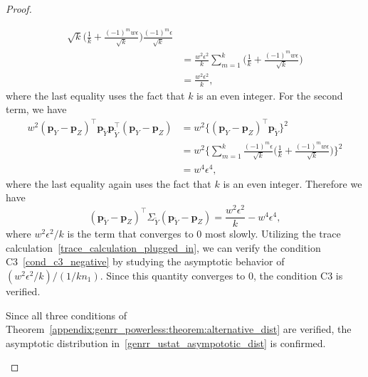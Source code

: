 \documentclass[twoside,11pt]{article}
\newcommand{\rvTwo}{Y}
\newcommand{\rvThree}{Z}
\newcommand{\alphabetSize}{k} %
\newcommand{\vectorIndex}{m}
\newcommand{\sampleSize}{n}
\newcommand{\probVec}{\mathbf{p}} %
\begin{document}
\begin{appendix}
\begin{proof}
\begin{itemize}
\begin{itemize}
\begin{align*}
{				}{
					\sqrt{\alphabetSize}
				}
				\biggl(
				\frac{1}{\alphabetSize}
				+
				\frac{
					(-1)^\vectorIndex 
					w\epsilon
				}{
					\sqrt{\alphabetSize}
				}
				\biggr)
				\frac{
					(-1)^\vectorIndex \epsilon
				}{
					\sqrt{\alphabetSize}
				}
				\\&=%
				\frac{w^2\epsilon^2}{
					\alphabetSize
				}
				\sum_{\vectorIndex=1}^\alphabetSize
				\biggl(
				\frac{1}{\alphabetSize}
				+
				\frac{
					(-1)^\vectorIndex w\epsilon
				}{
					\sqrt{\alphabetSize}
				}
				\biggr)
				\\&=%
				\frac{w^2\epsilon^2}{
					\alphabetSize
				},
			\end{align*}
			where the last equality uses the fact that $\alphabetSize$ is an even integer. For the second term, we have
			\begin{align*}
				w^2
				(\probVec_\rvTwo - \probVec_\rvThree)^\top 
				\probVec_{\tilde{\rvTwo}}
				\probVec_{\tilde{\rvTwo}}^\top
				(\probVec_\rvTwo - \probVec_\rvThree)
				&=
				w^2
				\bigl\{
				(\probVec_\rvTwo - \probVec_\rvThree)^\top 
				\probVec_{\tilde{\rvTwo}}
				\bigr\}^2
				\\&=
				w^2
				\biggl\{%
				\sum_{\vectorIndex=1}^\alphabetSize
				\frac{
					(-1)^\vectorIndex \epsilon
				}{
					\sqrt{\alphabetSize}
				}
				\biggl(
				\frac{1}{\alphabetSize}
				+
				\frac{
					(-1)^\vectorIndex w\epsilon
				}{
					\sqrt{\alphabetSize}
				}
				\biggr)
				\biggr\}^2%
				\\&=w^4 \epsilon^4,
			\end{align*}
			where  the last equality again uses the fact that $\alphabetSize$ is an even integer.
			Therefore we have
			\begin{equation}\label{noise_calculation_done}
				(\probVec_{\tilde{\rvTwo}} - \probVec_\rvThree)^\top 
				\Sigma_{
					\tilde{
						{\rvTwo}
					}
				}
				(\probVec_{\tilde{\rvTwo}} - \probVec_\rvThree)
				=
				\frac{w^2 \epsilon^2}{\alphabetSize}
				-
				w^4 \epsilon^4,
			\end{equation}
			where $w^2 \epsilon^2 / \alphabetSize$ is the term that converges to 0 most slowly. 
			Utilizing the trace calculation~\eqref{trace_calculation_plugged_in}, we can verify the condition C3~\eqref{cond_c3_negative}
			by studying the asymptotic behavior of $(w^2 \epsilon^2 / \alphabetSize)/(1/\alphabetSize \sampleSize_1)$. Since this quantity converges to 0, the condition C3  is verified.
		\end{itemize}
		Since all three conditions of Theorem~\ref{appendix:genrr_powerless:theorem:alternative_dist} are verified,  the asymptotic distribution in~\eqref{genrr_ustat_asympototic_dist} is confirmed.
		

\end{itemize}
\end{proof}
\end{appendix}
\end{document}
